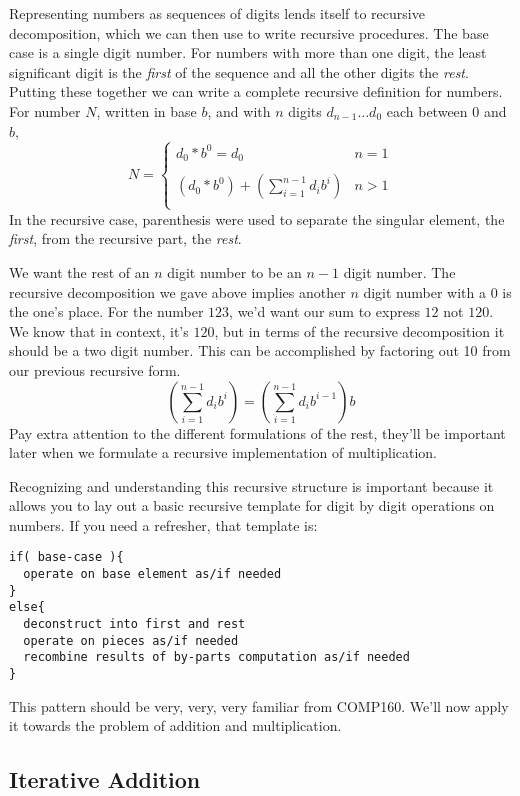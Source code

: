 \documentclass[10pt]{article}
\begin{document}
Representing numbers as sequences of digits lends itself to recursive decomposition, which we can then use to write recursive procedures. The base case is a single digit number. For numbers with more than one digit, the least significant digit is the \textit{first} of the sequence and all the other digits the \textit{rest}. Putting these together we can write a complete recursive definition for numbers. For number $N$, written in base $b$, and with $n$ digits $d_{n-1}\ldots d_{0}$ each between $0$ and $b$,
\[
N = \left\{
\begin{array}{ll}
d_0*b^0 = d_0  & n = 1 \\ \\
(d_{0}*b^{0}) + \left(\sum\limits_{i=1}^{n-1}d_ib^{i}\right) & n > 1 \\
\end{array}
\right.
\]
In the recursive case, parenthesis were used to separate the singular element, the \textit{first}, from the recursive part, the \textit{rest}. 

We want the rest of an $n$ digit number to be an $n-1$ digit number. The recursive decomposition we gave above implies another $n$ digit number with a $0$ is the one's place. For the number $123$, we'd want our sum to express $12$ not $120$. We know that in context, it's $120$, but in terms of the recursive decomposition it should be a two digit number. This can be accomplished by factoring out 10 from our previous recursive form.
\[
\left(\sum\limits_{i=1}^{n-1}d_ib^{i}\right) = \left(\sum\limits_{i=1}^{n-1}d_ib^{i-1}\right)b
\]
Pay extra attention to the different formulations of the rest, they'll be important later when we formulate a recursive implementation of multiplication.

Recognizing and understanding this recursive structure is important because it allows you to lay out a basic recursive template for digit by digit operations on numbers. If you need a refresher, that template is: 
\begin{verbatim}
if( base-case ){
  operate on base element as/if needed
}
else{
  deconstruct into first and rest  
  operate on pieces as/if needed
  recombine results of by-parts computation as/if needed
}
\end{verbatim}
This pattern should be very, very, very familiar from COMP160. We'll now apply it towards the problem of addition and multiplication. 

\subsection*{Iterative Addition}
\end{document}
